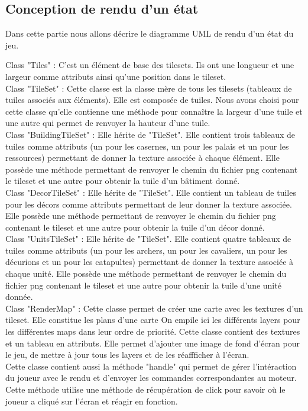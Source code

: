 \documentclass[12pt,a4paper]{article}
\begin{document}
\subsection{Conception de rendu d'un état}
Dans cette partie nous allons décrire le diagramme UML de rendu d'un état du jeu.

Class "Tiles" : C'est un élément de base des tilesets. Ils ont une longueur et une largeur comme attributs ainsi qu'une position dans le tileset.\\

Class "TileSet" : Cette classe est la classe mère de tous les tilesets (tableaux de tuiles associés aux éléments). Elle est composée de tuiles. Nous avons choisi pour cette classe qu'elle contienne une méthode pour connaître la largeur d'une tuile et une autre qui permet de renvoyer la hauteur d'une tuile.\\

Class "BuildingTileSet" :  Elle hérite de "TileSet". Elle contient trois tableaux de tuiles comme attributs (un pour les casernes, un pour les palais et un pour les ressources) permettant de donner la texture associée à chaque élément. Elle possède une méthode permettant de renvoyer le chemin du fichier png contenant le tileset et une autre pour obtenir la tuile d'un bâtiment donné. \\

Class "DecorTileSet" :  Elle hérite de "TileSet". Elle contient un tableau de tuiles pour les décors comme attributs permettant de leur donner la texture associée. Elle possède une méthode permettant de renvoyer le chemin du fichier png contenant le tileset et une autre pour obtenir la tuile d'un décor donné. \\

Class "UnitsTileSet" :  Elle hérite de "TileSet". Elle contient quatre tableaux de tuiles comme attributs (un pour les archers, un pour les cavaliers, un pour les décurions et un pour les catapultes) permettant de donner la texture associée à chaque unité. Elle possède une méthode permettant de renvoyer le chemin du fichier png contenant le tileset et une autre pour obtenir la tuile d'une unité donnée. \\

Class "RenderMap" : Cette classe permet de créer une carte avec les textures d'un tileset. Elle constitue les plans d'une carte On empile ici les différents layers pour les différentes maps dans leur ordre de priorité. Cette classe contient des textures et un tableau en attributs. Elle permet d'ajouter une image de fond d'écran pour le jeu, de mettre à jour tous les layers et de les réaffficher à l'écran.\\
Cette classe contient aussi la méthode "handle" qui permet de gérer l'intéraction du joueur avec le rendu et d'envoyer les commandes correspondantes au moteur. Cette méthode utilise une méthode de récupération de click pour savoir où le joueur a cliqué sur l'écran et réagir en fonction.\\
\end{document}
